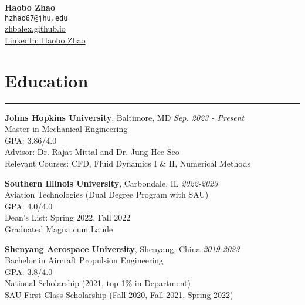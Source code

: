 \documentclass[11pt]{article}
\begin{document}

\begin{center}
    {\LARGE \textbf{Haobo Zhao}} \\
    \vspace{2mm}
    \small
    \texttt{hzhao67@jhu.edu} \\
    \vspace{1mm}
    \href{https://zhbalex.github.io}{zhbalex.github.io} \\
    \href{https://www.linkedin.com/in/haobo-zhao-035529229}{LinkedIn: Haobo Zhao}
\end{center}

\vspace{2mm}

\section*{Education}
\hrule

\noindent\textbf{Johns Hopkins University}, Baltimore, MD \hfill \textit{Sep. 2023 - Present} \\
Master in Mechanical Engineering \\
GPA: 3.86/4.0 \\
Advisor: Dr. Rajat Mittal and Dr. Jung-Hee Seo \\
Relevant Courses: CFD, Fluid Dynamics I \& II, Numerical Methods

\vspace{2mm}

\noindent\textbf{Southern Illinois University}, Carbondale, IL \hfill \textit{2022-2023} \\
Aviation Technologies (Dual Degree Program with SAU) \\
GPA: 4.0/4.0 \\
Dean's List: Spring 2022, Fall 2022 \\
Graduated Magna cum Laude

\vspace{2mm}

\noindent\textbf{Shenyang Aerospace University}, Shenyang, China \hfill \textit{2019-2023} \\
Bachelor in Aircraft Propulsion Engineering \\
GPA: 3.8/4.0 \\
National Scholarship (2021, top 1\% in Department) \\
SAU First Class Scholarship (Fall 2020, Fall 2021, Spring 2022)
\end{document}
